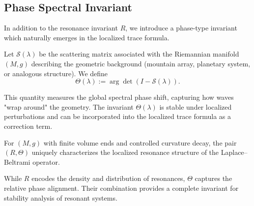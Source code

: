 \subsection{Phase Spectral Invariant}

In addition to the resonance invariant $R$, we introduce a phase-type invariant
which naturally emerges in the localized trace formula.

\begin{definition}
Let $\mathcal{S}(\lambda)$ be the scattering matrix associated with the
Riemannian manifold $(M,g)$ describing the geometric background (mountain array,
planetary system, or analogous structure).  
We define
\begin{equation}
  \Theta(\lambda) := \arg \det\!\left(I - \mathcal{S}(\lambda)\right).
\end{equation}
\end{definition}

This quantity measures the global spectral phase shift, capturing how waves
"wrap around" the geometry. The invariant $\Theta(\lambda)$ is stable under
localized perturbations and can be incorporated into the localized trace
formula as a correction term.

\begin{proposition}
For $(M,g)$ with finite volume ends and controlled curvature decay, the pair
$(R,\Theta)$ uniquely characterizes the localized resonance structure of the
Laplace--Beltrami operator.  
\end{proposition}

\begin{remark}
While $R$ encodes the density and distribution of resonances, $\Theta$ captures
the relative phase alignment. Their combination provides a complete invariant
for stability analysis of resonant systems.
\end{remark}
